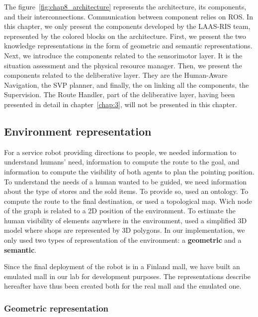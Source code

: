The figure~\ref{fig:chap8_architecture} represents the architecture, its components, and their interconnections. Communication between component relies on ROS. In this chapter, we only present the components developed by the LAAS-RIS team, represented by the colored blocks on the architecture. First, we present the two knowledge representations in the form of geometric and semantic representations. Next, we introduce the components related to the sensorimotor layer. It is the situation assessment and the physical resource manager. Then, we present the components related to the deliberative layer. They are the Human-Aware Navigation, the SVP planner, and finally, the on linking all the components, the Supervision. The Route Handler, part of the deliberative layer, having been presented in detail in chapter~\ref{chap:3}, will not be presented in this chapter.

\subsection{Environment representation}

For a service robot providing directions to people, we needed information to understand humans' need, information to compute the route to the goal, and information to compute the visibility of both agents to plan the pointing position. To understand the needs of a human wanted to be guided, we need information about the type of stores and the sold items. To provide so, \cite{satake_2015_field, satake_2015_should} used an ontology. To compute the route to the final destination, \cite{matsumoto_2012_you} or \cite{okuno_2009_providing} used a topological map. Wich node of the graph is related to a 2D position of the environment. To estimate the human visibility of elements anywhere in the environment, \cite{matsumoto_2012_you} used a simplified 3D model where shops are represented by 3D polygons. In our implementation, we only used two types of representation of the environment: a \textbf{geometric} and a \textbf{semantic}.

Since the final deployment of the robot is in a Finland mall, we have built an emulated mall in our lab for development purposes. The representations describe hereafter have thus been created both for the real mall and the emulated one.

\subsubsection{Geometric representation}

